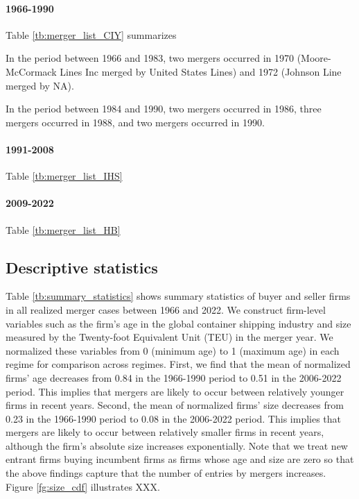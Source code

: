 \documentclass[10pt]{article}
\begin{document}
\paragraph{1966-1990} 

\cite{matsuda2022unified}

Table \ref{tb:merger_list_CIY} summarizes

In the period between 1966 and 1983, two mergers occurred in 1970 (Moore-McCormack Lines Inc merged by United States Lines) and 1972 (Johnson Line merged by NA).

In the period between 1984 and 1990, two mergers occurred in 1986, three mergers occurred in 1988, and two mergers occurred in 1990. 




\cite{matsuda2022unified}

\paragraph{1991-2008}


Table \ref{tb:merger_list_IHS}


\paragraph{2009-2022}


Table \ref{tb:merger_list_HB}






\subsection{Descriptive statistics}

Table \ref{tb:summary_statistics} shows summary statistics of buyer and seller firms in all realized merger cases between 1966 and 2022. 
We construct firm-level variables such as the firm's age in the global container shipping industry and size measured by the Twenty-foot Equivalent Unit (TEU) in the merger year. 
We normalized these variables from 0 (minimum age) to 1 (maximum age) in each regime for comparison across regimes.
First, we find that the mean of normalized firms' age decreases from 0.84 in the 1966-1990 period to 0.51 in the 2006-2022 period. This implies that mergers are likely to occur between relatively younger firms in recent years.
Second, the mean of normalized firms' size decreases from 0.23 in the 1966-1990 period to 0.08 in the 2006-2022 period. 
This implies that mergers are likely to occur between relatively smaller firms in recent years, although the firm's absolute size increases exponentially. 
Note that we treat new entrant firms buying incumbent firms as firms whose age and size are zero so that the above findings capture that the number of entries by mergers increases.
Figure \ref{fg:size_cdf} illustrates XXX.
\end{document}
